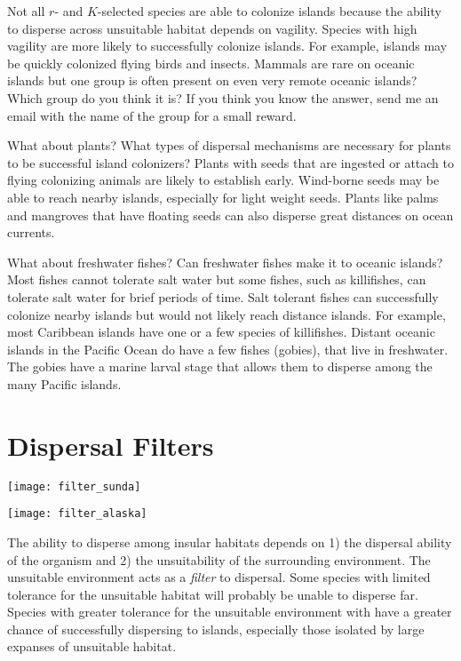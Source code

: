 \documentclass[letterpaper]{tufte-handout}
\begin{document}
Not all $r$- and $K$-selected species are able to colonize islands because the ability to disperse across unsuitable habitat depends on vagility.  Species with high vagility are more likely to successfully colonize islands.  For example, islands may be quickly colonized flying birds and insects.  Mammals are rare on oceanic islands but one group is often present on even very remote oceanic islands?  Which group do you think it is? If you think you know the answer, send me an email with the name of the group for a small reward. 

What about plants?  What types of dispersal mechanisms are necessary for plants to be successful island colonizers?  Plants with seeds that are ingested or attach to flying colonizing animals are likely to establish early. Wind-borne seeds may be able to reach nearby islands, especially for light weight seeds.  Plants like palms and mangroves that have floating seeds can also disperse great distances on ocean currents.

What about freshwater fishes?  Can freshwater fishes make it to oceanic islands?  Most fishes cannot tolerate salt water but some fishes, such as killifishes, can tolerate salt water for brief periods of time. Salt tolerant fishes can successfully colonize nearby islands but would not likely reach distance islands.  For example, most Caribbean islands have one or a few species of killifishes. Distant oceanic islands in the Pacific Ocean do have a few fishes (gobies), that live in freshwater.  The gobies have a marine larval stage that allows them to disperse among the many Pacific islands.  

\section{Dispersal Filters}
\begin{marginfigure}%
	\texttt{[image: filter\_sunda]}
\end{marginfigure} 
\begin{marginfigure}%
	\texttt{[image: filter\_alaska]}
\end{marginfigure} 

The ability to disperse among insular habitats depends on 1) the dispersal ability of the organism and 2) the unsuitability of the surrounding environment.  The unsuitable environment acts as a \textit{filter} to dispersal.  Some species with limited tolerance for the unsuitable habitat will probably be unable to disperse far. Species with greater tolerance for the unsuitable environment with have a greater chance of successfully dispersing to islands, especially those isolated by large expanses of unsuitable habitat.  
\end{document}
